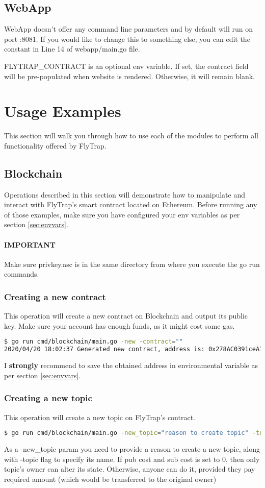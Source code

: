 \subsection{WebApp}
WebApp doesn't offer any command line parameters and by default will run on port :8081. If you would like to change this to something else, you can edit the constant in Line 14 of webapp/main.go file.

FLYTRAP\_CONTRACT is an optional env variable. If set, the contract field will be pre-populated when website is rendered. Otherwise, it will remain blank.
\section{Usage Examples}
This section will walk you through how to use each of the modules to perform all functionality offered by FlyTrap.
\subsection{Blockchain}
Operations described in this section will demonstrate how to manipulate and interact with FlyTrap's smart contract located on Ethereum. Before running any of those examples, make sure you have configured your env variables as per section \ref{sec:envvars}.

\paragraph{IMPORTANT} Make sure privkey.asc is in the same directory from where you execute the go run commands.
\subsubsection{Creating a new contract}
This operation will create a new contract on Blockchain and output its public key. Make sure your account has enough funds, as it might cost some gas.
\begin{lstlisting}[language=bash,breaklines=true]
$ go run cmd/blockchain/main.go -new -contract=""
2020/04/20 18:02:37 Generated new contract, address is: 0x278AC0391ceA1E7664D4242C7398FCDe79539a93
\end{lstlisting}
I \textbf{strongly} recommend to save the obtained address in environmental variable as per section \ref{sec:envvars}.
\subsubsection{Creating a new topic}
This operation will create a new topic on FlyTrap's contract.
\begin{lstlisting}[language=bash,breaklines=true]
$ go run cmd/blockchain/main.go -new_topic="reason to create topic" -topic="MyTestingTopic" -pub_cost=0 -sub_cost=0
\end{lstlisting}
As a -new\_topic param you need to provide a reason to create a new topic, along with -topic flag to specify its name. If pub cost and sub cost is set to 0, then only topic's owner can alter its state. Otherwise, anyone can do it, provided they pay required amount (which would be transferred to the original owner)
